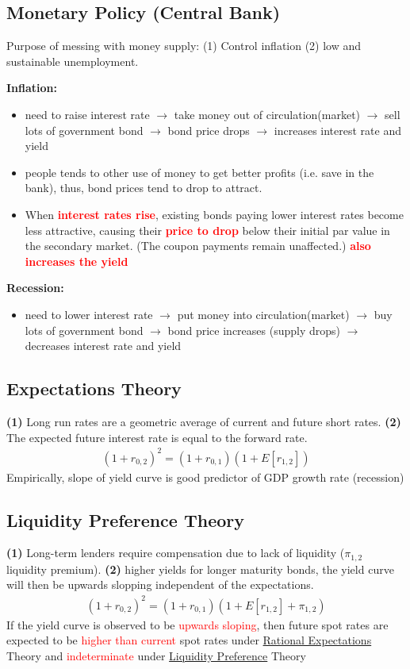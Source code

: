 \begin{multicols}{2}
\subsection{Monetary Policy (Central Bank)}
Purpose of messing with money supply: (1) Control inflation (2) low and sustainable unemployment. \par
\textbf{Inflation:}
\begin{itemize}
    \item need to raise interest rate $\rightarrow$ take money out of circulation(market) $\rightarrow$ sell lots of government bond $\rightarrow$ bond price drops 
    $\rightarrow$ increases interest rate and yield 
    \item people tends to other use of money to get better profits (i.e. save in the bank), thus, bond prices tend to drop to attract.
    \item When \textcolor{red}{\textbf{interest rates rise}}, existing bonds paying lower interest rates become less attractive, causing their \textcolor{red}{\textbf{price to drop}} below their initial par value in the secondary market. (The coupon payments remain unaffected.) \textcolor{red}{\textbf{also increases the yield}}
    
\end{itemize}
\textbf{Recession:}
\begin{itemize}
    \item need to lower interest rate $\rightarrow$ put money into circulation(market) $\rightarrow$ buy lots of government bond $\rightarrow$ bond price increases (supply drops) $\rightarrow$ decreases interest rate and yield 
\end{itemize}

\subsection{Expectations Theory}
\textbf{(1)} Long run rates are a geometric average of current and future short rates. \textbf{(2)} The expected future interest rate is equal to the forward rate.
\begin{gather*}
    (1+r_{0,2})^2 = (1+r_{0,1})(1+E[r_{1,2}])
\end{gather*}
Empirically, slope of yield curve is good predictor of GDP growth rate (recession)

\subsection{Liquidity Preference Theory}
\textbf{(1)} Long-term lenders require compensation due to lack of liquidity ($\pi_{1,2}$ liquidity premium). \textbf{(2)} higher yields for longer maturity bonds, the yield curve will then be upwards slopping independent of the expectations. 
\begin{gather*}
    (1+r_{0,2})^2 = (1+r_{0,1})(1+E[r_{1,2}]+\pi_{1,2})
\end{gather*}
If the yield curve is observed to be \textcolor{red}{upwards sloping}, then future spot rates are expected to be \textcolor{red}{higher than current} spot rates under \underline{Rational Expectations} Theory and \textcolor{red}{indeterminate} under \underline{Liquidity Preference} Theory

\end{multicols}
